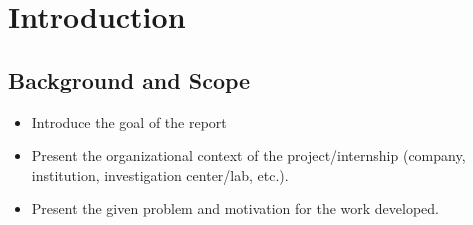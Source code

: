 \section{Introduction}
\label{section:introduction}









\subsection{Background and Scope}

\begin{itemize}
    \item Introduce the goal of the report
    \item Present the organizational context of the project/internship (company, institution, investigation center/lab, etc.).
    \item Present the given problem and motivation for the work developed.
\end{itemize}

